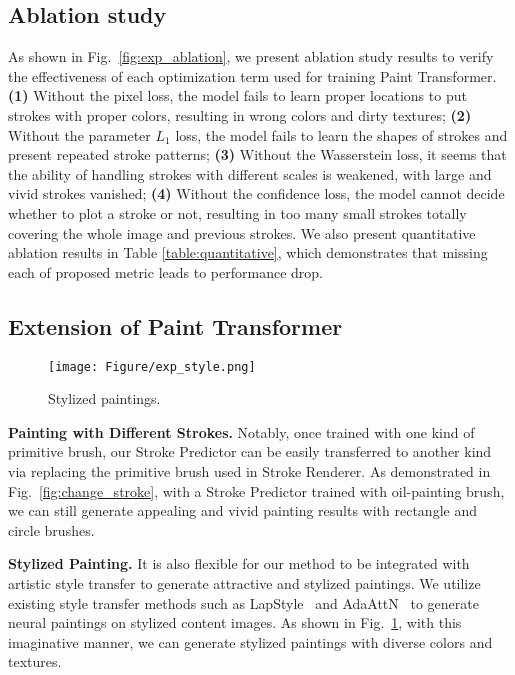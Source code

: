 \documentclass[10pt,twocolumn,letterpaper]{article}
\begin{document}
\subsection{Ablation study}

As shown in Fig.~\ref{fig:exp_ablation}, we present ablation study results to verify the effectiveness of each optimization term used for training Paint Transformer. 
\textbf{(1)} Without the pixel loss, the model fails to learn proper locations to put strokes with proper colors, resulting in wrong colors and dirty textures;
\textbf{(2)} Without the parameter $L_1$ loss, the model fails to learn the shapes of strokes and present repeated stroke patterns;
\textbf{(3)} Without the Wasserstein loss, it seems that the ability of handling strokes with different scales is weakened, with large and vivid strokes vanished;
\textbf{(4)} Without the confidence loss, the model cannot decide whether to plot a stroke or not, resulting in too many small strokes totally covering the whole image and previous strokes. 
We also present quantitative ablation results in Table \ref{table:quantitative}, which demonstrates that missing each of proposed metric leads to performance drop.

\subsection{Extension of Paint Transformer}

\begin{figure}[t]
\begin{center}
\texttt{[image: Figure/exp\_style.png]}
\end{center}
\vspace{-0.2cm}
   \caption{Stylized paintings.}
\label{fig:exp_style}
\vspace{-0.5cm}
\end{figure}

\noindent
\textbf{Painting with Different Strokes. }
Notably, once trained with one kind of primitive brush, our Stroke Predictor can be easily transferred to another kind via replacing the primitive brush used in Stroke Renderer.
As demonstrated in Fig.~\ref{fig:change_stroke}, with a Stroke Predictor trained with oil-painting brush, we can still generate appealing and vivid painting results with rectangle and circle brushes.

\noindent
\textbf{Stylized Painting. }
It is also flexible for our method to be integrated with artistic style transfer to generate attractive and stylized paintings. 
We utilize existing style transfer methods such as LapStyle~\cite{lin2021drafting} and AdaAttN~\cite{liu2021adaattn} to generate neural paintings on stylized content images.
As shown in Fig.~\ref{fig:exp_style}, with this imaginative manner, we can generate stylized paintings with diverse colors and textures.
\end{document}
